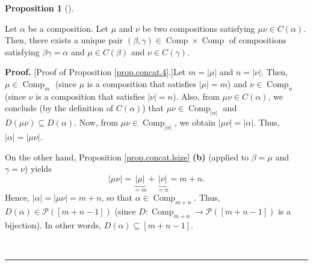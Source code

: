 \documentclass[numbers=enddot,12pt,final,onecolumn,notitlepage]{scrartcl}%
\theoremstyle{definition}
\newtheorem{prop}[theo]{Proposition}
\newenvironment{proposition}[1][]
{\begin{prop}[#1]\begin{leftbar}}
{\end{leftbar}\end{prop}}
\newenvironment{proof}[1][Proof]{\noindent\textbf{#1.} }{\ \rule{0.5em}{0.5em}}
\begin{document}
\begin{proposition}
\label{prop.concat.4}Let $\alpha$ be a composition. Let $\mu$ and $\nu$ be two
compositions satisfying $\mu\nu\in C\left(  \alpha\right)  $. Then, there
exists a unique pair $\left(  \beta,\gamma\right)  \in\operatorname*{Comp}%
\times\operatorname*{Comp}$ of compositions satisfying $\beta\gamma=\alpha$
and $\mu\in C\left(  \beta\right)  $ and $\nu\in C\left(  \gamma\right)  $.
\end{proposition}

\begin{proof}
[Proof of Proposition \ref{prop.concat.4}.]Let $m=\left\vert \mu\right\vert $
and $n=\left\vert \nu\right\vert $. Then, $\mu\in\operatorname*{Comp}%
\nolimits_{m}$ (since $\mu$ is a composition that satisfies $\left\vert
\mu\right\vert =m$) and $\nu\in\operatorname*{Comp}\nolimits_{n}$ (since $\nu$
is a composition that satisfies $\left\vert \nu\right\vert =n$). Also, from
$\mu\nu\in C\left(  \alpha\right)  $, we conclude (by the definition of
$C\left(  \alpha\right)  $) that $\mu\nu\in\operatorname*{Comp}%
\nolimits_{\left\vert \alpha\right\vert }$ and $D\left(  \mu\nu\right)
\subseteq D\left(  \alpha\right)  $. Now, from $\mu\nu\in\operatorname*{Comp}%
\nolimits_{\left\vert \alpha\right\vert }$, we obtain $\left\vert \mu
\nu\right\vert =\left\vert \alpha\right\vert $. Thus, $\left\vert
\alpha\right\vert =\left\vert \mu\nu\right\vert $.

On the other hand, Proposition \ref{prop.concat.lsize} \textbf{(b)} (applied
to $\beta=\mu$ and $\gamma=\nu$) yields
\[
\left\vert \mu\nu\right\vert =\underbrace{\left\vert \mu\right\vert }%
_{=m}+\underbrace{\left\vert \nu\right\vert }_{=n}=m+n.
\]
Hence, $\left\vert \alpha\right\vert =\left\vert \mu\nu\right\vert =m+n$, so
that $\alpha\in\operatorname*{Comp}\nolimits_{m+n}$. Thus, $D\left(
\alpha\right)  \in\mathcal{P}\left(  \left[  m+n-1\right]  \right)  $ (since
$D:\operatorname*{Comp}\nolimits_{m+n}\rightarrow\mathcal{P}\left(  \left[
m+n-1\right]  \right)  $ is a bijection). In other words, $D\left(
\alpha\right)  \subseteq\left[  m+n-1\right]  $.


\end{proof}
\end{document}

